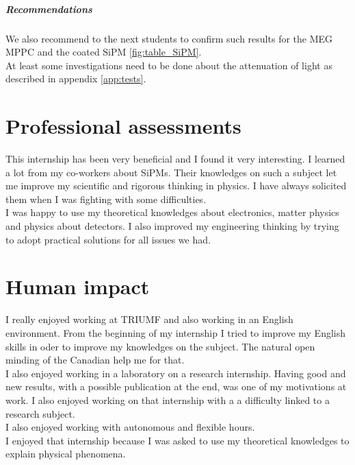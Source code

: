 \documentclass[a4paper, 11pt]{report}%
\begin{document}
  \paragraph{\textit{Recommendations }}
  We also recommend to the next students to confirm such results for the MEG MPPC and the coated SiPM \ref{fig:table_SiPM}.\\  
  At least some investigations need to be done about the attenuation of light as described in appendix \ref{app:tests}.
  

\chapter{Professional assessments} 

  This internship has been very beneficial and I found it very interesting. I learned a lot from my co-workers about SiPMs. 
  Their knowledges on such a subject let me improve my scientific and rigorous thinking in physics. 
  I have always solicited them when I was fighting with some difficulties.
  \\
  
  I was happy to use my theoretical knowledges about electronics, matter physics and 
  physics about detectors. I also improved my engineering thinking by trying 
  to adopt practical solutions for all issues we had.  
  \\
  
   
  

\chapter{Human impact}

  I really enjoyed working at TRIUMF and also working in an English environment. 
  From the beginning of my internship I tried to improve my English skills in oder
  to improve my knowledges on the subject. The natural open minding of the Canadian
  help me for that. 
  \\
  
  I also enjoyed working in a laboratory on a research internship. Having good and new results, with a possible publication at the 
  end, was one of my motivations at work. I also enjoyed working on that internship with a a difficulty linked to a research subject.\\
  I also enjoyed working with autonomous and flexible hours.\\
  I enjoyed that internship because I was asked to use my theoretical knowledges to explain physical phenomena. 
  
\end{document}
